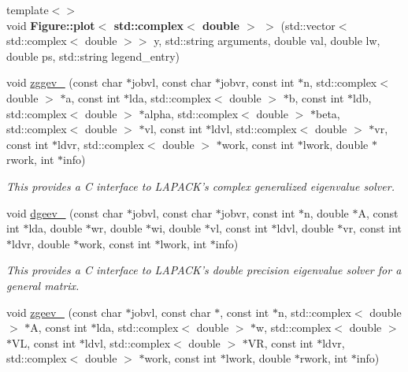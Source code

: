 \begin{DoxyCompactItemize}
\item 
\hypertarget{namespacekeycpp_acfb9f560ec3a131190f23bf18c12b2f8}{{\footnotesize template$<$$>$ }\\void {\bfseries Figure\-::plot$<$ std\-::complex$<$ double $>$ $>$} (std\-::vector$<$ std\-::complex$<$ double $>$$>$ y, std\-::string arguments, double val, double lw, double ps, std\-::string legend\-\_\-entry)}\label{namespacekeycpp_acfb9f560ec3a131190f23bf18c12b2f8}

\item 
\hypertarget{namespacekeycpp_ace2501951ab3db3a91c3520ae89750b1}{void \hyperlink{namespacekeycpp_ace2501951ab3db3a91c3520ae89750b1}{zggev\-\_\-} (const char $\ast$jobvl, const char $\ast$jobvr, const int $\ast$n, std\-::complex$<$ double $>$ $\ast$a, const int $\ast$lda, std\-::complex$<$ double $>$ $\ast$b, const int $\ast$ldb, std\-::complex$<$ double $>$ $\ast$alpha, std\-::complex$<$ double $>$ $\ast$beta, std\-::complex$<$ double $>$ $\ast$vl, const int $\ast$ldvl, std\-::complex$<$ double $>$ $\ast$vr, const int $\ast$ldvr, std\-::complex$<$ double $>$ $\ast$work, const int $\ast$lwork, double $\ast$rwork, int $\ast$info)}\label{namespacekeycpp_ace2501951ab3db3a91c3520ae89750b1}

\begin{DoxyCompactList}\small\item\em This provides a C interface to L\-A\-P\-A\-C\-K's complex generalized eigenvalue solver. \end{DoxyCompactList}\item 
\hypertarget{namespacekeycpp_aebc5253e80ac15a9bfdc5449ae4f972a}{void \hyperlink{namespacekeycpp_aebc5253e80ac15a9bfdc5449ae4f972a}{dgeev\-\_\-} (const char $\ast$jobvl, const char $\ast$jobvr, const int $\ast$n, double $\ast$A, const int $\ast$lda, double $\ast$wr, double $\ast$wi, double $\ast$vl, const int $\ast$ldvl, double $\ast$vr, const int $\ast$ldvr, double $\ast$work, const int $\ast$lwork, int $\ast$info)}\label{namespacekeycpp_aebc5253e80ac15a9bfdc5449ae4f972a}

\begin{DoxyCompactList}\small\item\em This provides a C interface to L\-A\-P\-A\-C\-K's double precision eigenvalue solver for a general matrix. \end{DoxyCompactList}\item 
\hypertarget{namespacekeycpp_a8c1cca2a162f40fc6c6218c35cadf9f2}{void \hyperlink{namespacekeycpp_a8c1cca2a162f40fc6c6218c35cadf9f2}{zgeev\-\_\-} (const char $\ast$jobvl, const char $\ast$, const int $\ast$n, std\-::complex$<$ double $>$ $\ast$A, const int $\ast$lda, std\-::complex$<$ double $>$ $\ast$w, std\-::complex$<$ double $>$ $\ast$V\-L, const int $\ast$ldvl, std\-::complex$<$ double $>$ $\ast$V\-R, const int $\ast$ldvr, std\-::complex$<$ double $>$ $\ast$work, const int $\ast$lwork, double $\ast$rwork, int $\ast$info)}\label{namespacekeycpp_a8c1cca2a162f40fc6c6218c35cadf9f2}


\end{DoxyCompactItemize}
